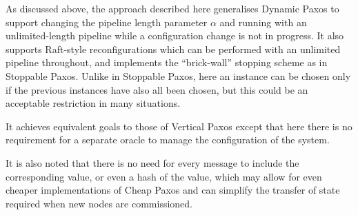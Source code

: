 \documentclass[journal]{IEEEtran}
\begin{document}
As discussed above, the approach described here generalises Dynamic
Paxos\cite{cheap-paxos} to support changing the pipeline length parameter
$\alpha$ and running with an unlimited-length pipeline while a configuration
change is not in progress. It also supports Raft-style
reconfigurations\cite{raft} which can be performed with an unlimited pipeline
throughout, and implements the ``brick-wall'' stopping scheme as in Stoppable
Paxos\cite{stoppable-paxos}. Unlike in Stoppable Paxos, here an instance can be
chosen only if the previous instances have also all been chosen, but this could
be an acceptable restriction in many situations.

It achieves equivalent goals to those of Vertical Paxos\cite{vertical-paxos}
except that here there is no requirement for a separate oracle to manage the
configuration of the system.

It is also noted that there is no need for every message to include the
corresponding value, or even a hash of the value, which may allow for even
cheaper implementations of Cheap Paxos\cite{cheap-paxos} and can simplify the
transfer of state\cite{vertical-paxos} required when new nodes are
commissioned.

%
%

\end{document}
